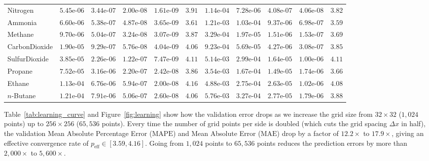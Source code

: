 \documentclass[10pt,a4paper]{article}
\begin{document}
\begin{table}[ht!]
{\begin{tabular}{lrrrrrrrrrr}
Nitrogen & $5.45\text{e-}06$ & $3.44\text{e-}07$ & $2.00\text{e-}08$ & $1.61\text{e-}09$ & $3.91$ & $1.14\text{e-}04$ & $7.28\text{e-}06$ & $4.08\text{e-}07$ & $4.06\text{e-}08$ & $3.82$ \\
Ammonia & $6.60\text{e-}06$ & $5.38\text{e-}07$ & $4.87\text{e-}08$ & $3.65\text{e-}09$ & $3.61$ & $1.21\text{e-}03$ & $1.03\text{e-}04$ & $9.37\text{e-}06$ & $6.98\text{e-}07$ & $3.59$ \\
Methane & $9.70\text{e-}06$ & $5.04\text{e-}07$ & $3.24\text{e-}08$ & $3.07\text{e-}09$ & $3.87$ & $3.29\text{e-}04$ & $1.97\text{e-}05$ & $1.51\text{e-}06$ & $1.53\text{e-}07$ & $3.69$ \\
CarbonDioxide & $1.90\text{e-}05$ & $9.29\text{e-}07$ & $5.76\text{e-}08$ & $4.04\text{e-}09$ & $4.06$ & $9.23\text{e-}04$ & $5.69\text{e-}05$ & $4.27\text{e-}06$ & $3.08\text{e-}07$ & $3.85$ \\
SulfurDioxide & $3.85\text{e-}05$ & $2.26\text{e-}06$ & $1.22\text{e-}07$ & $7.47\text{e-}09$ & $4.11$ & $5.14\text{e-}03$ & $2.99\text{e-}04$ & $1.64\text{e-}05$ & $1.00\text{e-}06$ & $4.11$ \\
Propane & $7.52\text{e-}05$ & $3.16\text{e-}06$ & $2.20\text{e-}07$ & $2.42\text{e-}08$ & $3.86$ & $3.54\text{e-}03$ & $1.67\text{e-}04$ & $1.49\text{e-}05$ & $1.74\text{e-}06$ & $3.66$ \\
Ethane & $1.13\text{e-}04$ & $6.76\text{e-}06$ & $5.94\text{e-}07$ & $2.00\text{e-}08$ & $4.16$ & $4.88\text{e-}03$ & $2.75\text{e-}04$ & $2.63\text{e-}05$ & $1.02\text{e-}06$ & $4.08$ \\
$n$-Butane & $1.21\text{e-}04$ & $7.91\text{e-}06$ & $5.06\text{e-}07$ & $2.60\text{e-}08$ & $4.06$ & $5.76\text{e-}03$ & $3.27\text{e-}04$ & $2.77\text{e-}05$ & $1.79\text{e-}06$ & $3.88$ \\
\bottomrule
\end{tabular}}
\end{table}

Table~\ref{tab:learning_curve} and Figure~\ref{fig:learning} show how the validation error drops as we increase the grid size from $32 \times 32$ ($1{,}024$ points) up to $256 \times 256$ ($65{,}536$ points). Every time the number of grid points per side is doubled (which cuts the grid spacing $\Delta x$ in half), the validation Mean Absolute Percentage Error ($\mathrm{MAPE}$) and Mean Absolute Error ($\mathrm{MAE}$) drop by a factor of $12.2\times$ to $17.9\times$, giving an effective convergence rate of $p_{\mathrm{eff}} \in [3.59, 4.16]$. Going from $1{,}024$ points to $65{,}536$ points reduces the prediction errors by more than $2{,}000\times$ to $5{,}600\times$.
\end{document}
